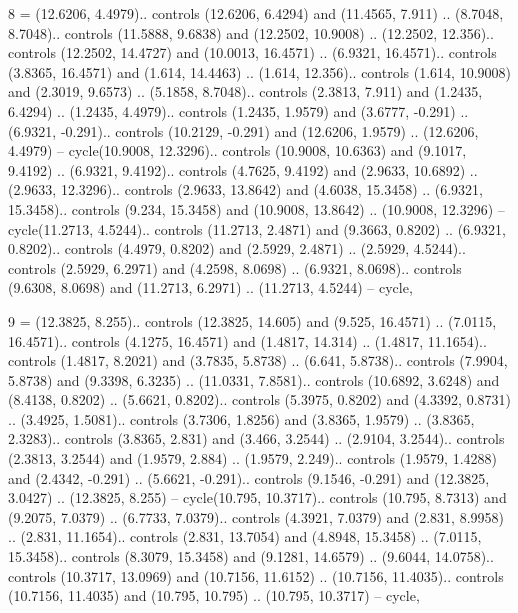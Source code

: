 8 = {(12.6206, 4.4979).. controls (12.6206, 6.4294) and (11.4565, 7.911) .. (8.7048, 8.7048).. controls (11.5888, 9.6838) and (12.2502, 10.9008) .. (12.2502, 12.356).. controls (12.2502, 14.4727) and (10.0013, 16.4571) .. (6.9321, 16.4571).. controls (3.8365, 16.4571) and (1.614, 14.4463) .. (1.614, 12.356).. controls (1.614, 10.9008) and (2.3019, 9.6573) .. (5.1858, 8.7048).. controls (2.3813, 7.911) and (1.2435, 6.4294) .. (1.2435, 4.4979).. controls (1.2435, 1.9579) and (3.6777, -0.291) .. (6.9321, -0.291).. controls (10.2129, -0.291) and (12.6206, 1.9579) .. (12.6206, 4.4979) -- cycle(10.9008, 12.3296).. controls (10.9008, 10.6363) and (9.1017, 9.4192) .. (6.9321, 9.4192).. controls (4.7625, 9.4192) and (2.9633, 10.6892) .. (2.9633, 12.3296).. controls (2.9633, 13.8642) and (4.6038, 15.3458) .. (6.9321, 15.3458).. controls (9.234, 15.3458) and (10.9008, 13.8642) .. (10.9008, 12.3296) -- cycle(11.2713, 4.5244).. controls (11.2713, 2.4871) and (9.3663, 0.8202) .. (6.9321, 0.8202).. controls (4.4979, 0.8202) and (2.5929, 2.4871) .. (2.5929, 4.5244).. controls (2.5929, 6.2971) and (4.2598, 8.0698) .. (6.9321, 8.0698).. controls (9.6308, 8.0698) and (11.2713, 6.2971) .. (11.2713, 4.5244) -- cycle},

9 = {(12.3825, 8.255).. controls (12.3825, 14.605) and (9.525, 16.4571) .. (7.0115, 16.4571).. controls (4.1275, 16.4571) and (1.4817, 14.314) .. (1.4817, 11.1654).. controls (1.4817, 8.2021) and (3.7835, 5.8738) .. (6.641, 5.8738).. controls (7.9904, 5.8738) and (9.3398, 6.3235) .. (11.0331, 7.8581).. controls (10.6892, 3.6248) and (8.4138, 0.8202) .. (5.6621, 0.8202).. controls (5.3975, 0.8202) and (4.3392, 0.8731) .. (3.4925, 1.5081).. controls (3.7306, 1.8256) and (3.8365, 1.9579) .. (3.8365, 2.3283).. controls (3.8365, 2.831) and (3.466, 3.2544) .. (2.9104, 3.2544).. controls (2.3813, 3.2544) and (1.9579, 2.884) .. (1.9579, 2.249).. controls (1.9579, 1.4288) and (2.4342, -0.291) .. (5.6621, -0.291).. controls (9.1546, -0.291) and (12.3825, 3.0427) .. (12.3825, 8.255) -- cycle(10.795, 10.3717).. controls (10.795, 8.7313) and (9.2075, 7.0379) .. (6.7733, 7.0379).. controls (4.3921, 7.0379) and (2.831, 8.9958) .. (2.831, 11.1654).. controls (2.831, 13.7054) and (4.8948, 15.3458) .. (7.0115, 15.3458).. controls (8.3079, 15.3458) and (9.1281, 14.6579) .. (9.6044, 14.0758).. controls (10.3717, 13.0969) and (10.7156, 11.6152) .. (10.7156, 11.4035).. controls (10.7156, 11.4035) and (10.795, 10.795) .. (10.795, 10.3717) -- cycle},